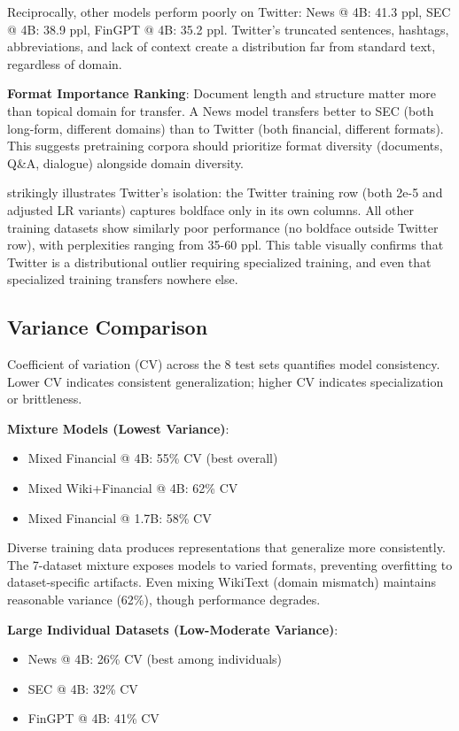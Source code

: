 Reciprocally, other models perform poorly on Twitter: News @ 4B: 41.3 ppl, SEC @ 4B: 38.9 ppl, FinGPT @ 4B: 35.2 ppl. Twitter's truncated sentences, hashtags, abbreviations, and lack of context create a distribution far from standard text, regardless of domain.

\textbf{Format Importance Ranking}: Document length and structure matter more than topical domain for transfer. A News model transfers better to SEC (both long-form, different domains) than to Twitter (both financial, different formats). This suggests pretraining corpora should prioritize format diversity (documents, Q\&A, dialogue) alongside domain diversity.



 strikingly illustrates Twitter's isolation: the Twitter training row (both 2e-5 and adjusted LR variants) captures boldface only in its own columns. All other training datasets show similarly poor performance (no boldface outside Twitter row), with perplexities ranging from 35-60 ppl. This table visually confirms that Twitter is a distributional outlier requiring specialized training, and even that specialized training transfers nowhere else.

\subsection{Variance Comparison}

Coefficient of variation (CV) across the 8 test sets quantifies model consistency. Lower CV indicates consistent generalization; higher CV indicates specialization or brittleness.

\textbf{Mixture Models (Lowest Variance)}:
\begin{itemize}
\item Mixed Financial @ 4B: 55\% CV (best overall)
\item Mixed Wiki+Financial @ 4B: 62\% CV
\item Mixed Financial @ 1.7B: 58\% CV
\end{itemize}

Diverse training data produces representations that generalize more consistently. The 7-dataset mixture exposes models to varied formats, preventing overfitting to dataset-specific artifacts. Even mixing WikiText (domain mismatch) maintains reasonable variance (62\%), though performance degrades.

\textbf{Large Individual Datasets (Low-Moderate Variance)}:
\begin{itemize}
\item News @ 4B: 26\% CV (best among individuals)
\item SEC @ 4B: 32\% CV
\item FinGPT @ 4B: 41\% CV
\end{itemize}

